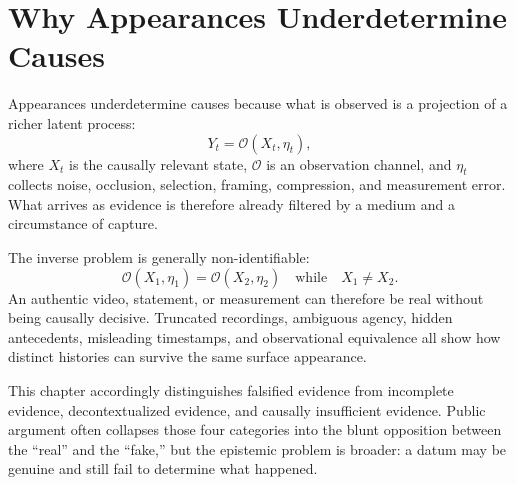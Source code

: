 
\chapter{Why Appearances Underdetermine Causes}
\label{ch:ch002}


Appearances underdetermine causes because what is observed is a projection of a richer latent process:
\[
Y_t=\mathcal O(X_t,\eta_t),
\]
where \(X_t\) is the causally relevant state, \(\mathcal O\) is an observation channel, and \(\eta_t\) collects noise, occlusion, selection, framing, compression, and measurement error. What arrives as evidence is therefore already filtered by a medium and a circumstance of capture.

The inverse problem is generally non-identifiable:
\[
\mathcal O(X_1,\eta_1)=\mathcal O(X_2,\eta_2)
\quad\text{while}\quad
X_1\neq X_2.
\]
An authentic video, statement, or measurement can therefore be real without being causally decisive. Truncated recordings, ambiguous agency, hidden antecedents, misleading timestamps, and observational equivalence all show how distinct histories can survive the same surface appearance.

This chapter accordingly distinguishes falsified evidence from incomplete evidence, decontextualized evidence, and causally insufficient evidence. Public argument often collapses those four categories into the blunt opposition between the ``real'' and the ``fake,'' but the epistemic problem is broader: a datum may be genuine and still fail to determine what happened.
